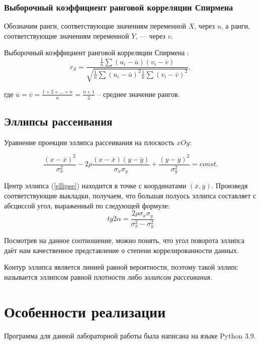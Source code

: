 \documentclass[12pt]{article}
\begin{document}
\subsubsection{Выборочный коэффициент ранговой корреляции Спирмена}

Обозначим ранги, соответствующие значениям переменной $X$, через $u$, а ранги, соответствующие значениям переменной $Y$, — через $v$.

        Выборочный коэффициент ранговой корреляции Спирмена :
       \begin{equation}
r_S = \frac{\frac{1}{n} \sum (u_i - \overline{u})(v_i - \overline{v})}{\sqrt{\frac{1}{n} \sum (u_i - \overline{u})^2 \frac{1}{n} \sum (v_i - \overline{v})^2}},
\label{rs}
\end{equation}

        где $\overline{u} = \overline{v} = \frac{1 + 2 + ... + n}{n} = \frac{n+1}{2}$ -- среднее значение рангов. \cite{lit1}
\subsection{Эллипсы рассеивания}

Уравнение проекции эллипса рассеивания на плоскость $xOy$:

    \begin{equation}
        \frac{(x-\overline{x})^2}{\sigma_x^2} - 2\rho\frac{(x-\overline{x})(y-\overline{y})}{\sigma_x\sigma_y} + \frac{(y-\overline{y})^2}{\sigma_y^2} = const.
        \label{ellipse}
    \end{equation}

Центр эллипса (\ref{ellipse}) находится в точке с координатами $(\overline{x}, \overline{y})$.
Произведя соответствующие выкладки, получаем, что большая полуось эллипса составляет с абсциссой угол, выраженный по следующей формуле:
\begin{equation}\label{tga}
	tg 2\alpha = \frac{2 \rho \sigma_x \sigma_y}{\sigma_x^2 - \sigma_y^2}
\end{equation}

Посмотрев на данное соотношение, можно понять, что угол поворота эллипса даёт нам качественное представление о степени коррелированности данных.

Контур эллипса является линией равной вероятности, поэтому такой эллипс называется эллипсом равной плотности либо {\it эллипсом рассеивания}. \cite{lit2}
\newpage
\section{Особенности реализации}
Программа для данной лабораторной работы была написана на языке Python 3.9. 
\end{document}
